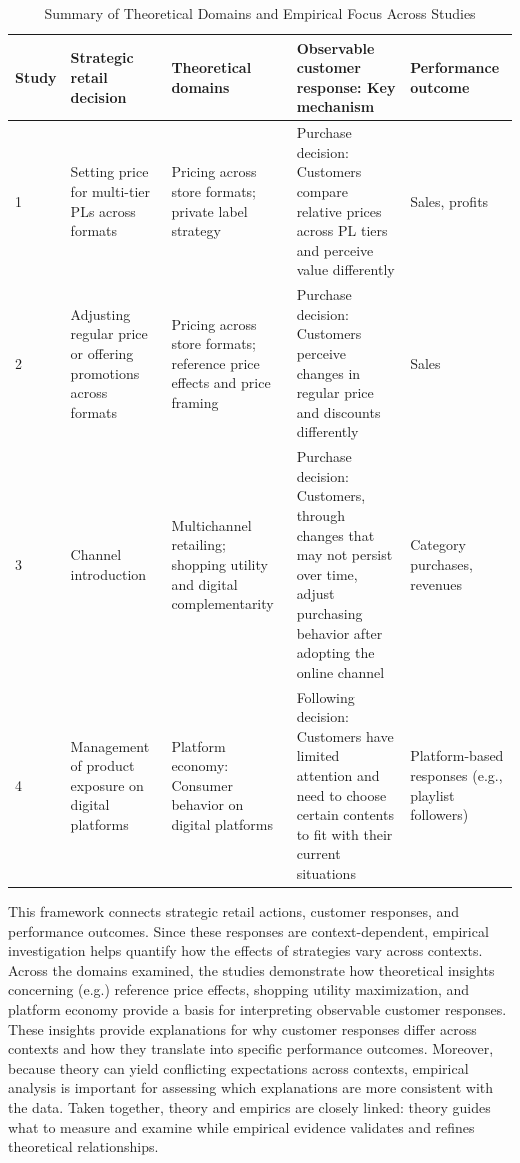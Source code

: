 \begin{table}[!htbp]
\centering
\begin{tabular}{p{0.4cm} p{1.9cm} p{3.2cm} p{3.6cm} p{1.5cm}}
\hline
\textbf{Study} & \textbf{Strategic retail decision} & \textbf{Theoretical domains} & \textbf{Observable customer response: Key mechanism} & \textbf{Performance outcome} \\
\hline

1 & Setting price for multi-tier PLs across formats 
& Pricing across store formats; private label strategy 
& Purchase decision: Customers compare relative prices across PL tiers and perceive value differently 
& Sales, profits \\
\hline

2 & Adjusting regular price or offering promotions across formats 
& Pricing across store formats; reference price effects and price framing 
& Purchase decision: Customers perceive changes in regular price and discounts differently 
& Sales \\
\hline

3 & Channel introduction 
& Multichannel retailing; shopping utility and digital complementarity 
& Purchase decision: Customers, through changes that may not persist over time, adjust purchasing behavior after adopting the online channel 
& Category purchases, revenues \\
\hline

4 & Management of product exposure on digital platforms 
& Platform economy: Consumer behavior on digital platforms 
& Following decision: Customers have limited attention and need to choose certain contents to fit with their current situations 
& Platform-based responses (e.g., playlist followers) \\

\hline
\end{tabular}
\caption{Summary of Theoretical Domains and Empirical Focus Across Studies}
\label{tab:theory_overview}
\end{table}

This framework connects strategic retail actions, customer responses, and performance outcomes. Since these responses are context-dependent, empirical investigation helps quantify how the effects of strategies vary across contexts. Across the domains examined, the studies demonstrate how theoretical insights concerning (e.g.) reference price effects, shopping utility maximization, and platform economy provide a basis for interpreting observable customer responses. These insights provide explanations for why customer responses differ across contexts and how they translate into specific performance outcomes. Moreover, because theory can yield conflicting expectations across contexts, empirical analysis is important for assessing which explanations are more consistent with the data. Taken together, theory and empirics are closely linked: theory guides what to measure and examine while empirical evidence validates and refines theoretical relationships.